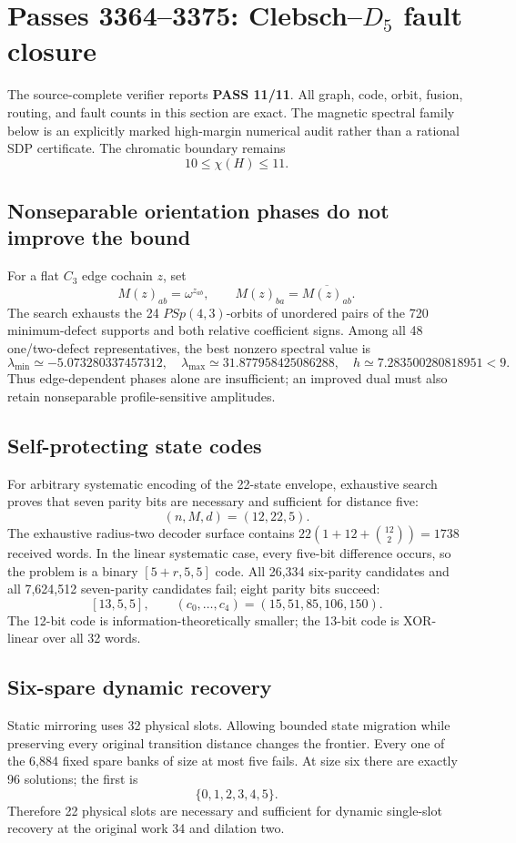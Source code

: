 \section{Passes 3364--3375: Clebsch--\(D_5\) fault closure}
\label{sec:bt3364-3375-clebsch-d5}

The source-complete verifier reports \textbf{PASS 11/11}.  All graph, code,
orbit, fusion, routing, and fault counts in this section are exact.  The magnetic
spectral family below is an explicitly marked high-margin numerical audit rather
than a rational SDP certificate.  The chromatic boundary remains
\[
  \boxed{10\leq\chi(H)\leq 11}.
\]

\subsection{Nonseparable orientation phases do not improve the bound}
For a flat \(C_3\) edge cochain \(z\), set
\[
 M(z)_{ab}=\omega^{z_{ab}},\qquad M(z)_{ba}=\overline{M(z)_{ab}}.
\]
The search exhausts the 24 \(PSp(4,3)\)-orbits of unordered pairs of the
720 minimum-defect supports and both relative coefficient signs.  Among all
48 one/two-defect representatives, the best nonzero spectral value is
\[
 \lambda_{\min}\simeq-5.073280337457312,
 \quad \lambda_{\max}\simeq31.877958425086288,
 \quad h\simeq7.283500280818951<9.
\]
Thus edge-dependent phases alone are insufficient; an improved dual must also
retain nonseparable profile-sensitive amplitudes.

\subsection{Self-protecting state codes}
For arbitrary systematic encoding of the 22-state envelope, exhaustive search
proves that seven parity bits are necessary and sufficient for distance five:
\[
 \boxed{(n,M,d)=(12,22,5)}.
\]
The exhaustive radius-two decoder surface contains
\(22(1+12+\binom{12}{2})=1738\) received words.  In the linear systematic
case, every five-bit difference occurs, so the problem is a binary
\([5+r,5,5]\) code.  All 26,334 six-parity candidates and all 7,624,512
seven-parity candidates fail; eight parity bits succeed:
\[
 \boxed{[13,5,5]},
 \qquad (c_0,\ldots,c_4)=(15,51,85,106,150).
\]
The 12-bit code is information-theoretically smaller; the 13-bit code is
XOR-linear over all 32 words.

\subsection{Six-spare dynamic recovery}
Static mirroring uses 32 physical slots.  Allowing bounded state migration while
preserving every original transition distance changes the frontier.  Every one
of the 6,884 fixed spare banks of size at most five fails.  At size six there
are exactly 96 solutions; the first is
\[
 \boxed{\{0,1,2,3,4,5\}}.
\]
Therefore 22 physical slots are necessary and sufficient for dynamic
single-slot recovery at the original work 34 and dilation two.

